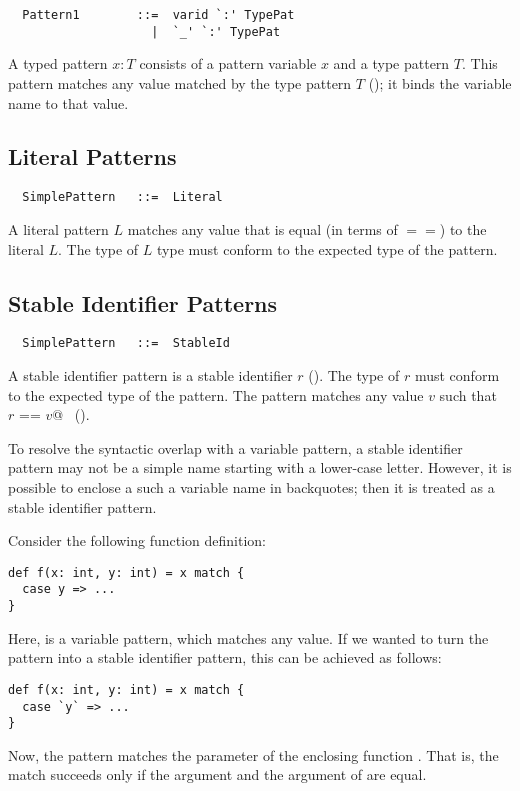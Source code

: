 \syntax
\begin{lstlisting}
  Pattern1        ::=  varid `:' TypePat
                    |  `_' `:' TypePat
\end{lstlisting}

A typed pattern $x: T$ consists of a pattern variable $x$ and a
type pattern $T$.  This pattern matches any value matched by the type
pattern $T$ (); it binds the variable name to
that value.

\subsection{Literal Patterns}

\syntax\begin{lstlisting}
  SimplePattern   ::=  Literal
\end{lstlisting}

A literal pattern $L$ matches any value that is equal (in terms of
$==$) to the literal $L$. The type of $L$ type must conform to the
expected type of the pattern.

\subsection{Stable Identifier Patterns} 

\syntax
\begin{lstlisting}
  SimplePattern   ::=  StableId
\end{lstlisting}

A stable identifier pattern is a stable identifier $r$
(). The type of $r$ must conform to the expected
type of the pattern. The pattern matches any value $v$ such that
~\lstinline@$r$ == $v$@~ ().

To resolve the syntactic overlap with a variable pattern, a
stable identifier pattern may not be a simple name starting with a lower-case
letter. However, it is possible to enclose a such a variable name in
backquotes; then it is treated as a stable identifier pattern.

\example Consider the following function definition:
\begin{lstlisting}
def f(x: int, y: int) = x match {
  case y => ...
}
\end{lstlisting}
Here, \lstinline@y@ is a variable pattern, which matches any value.
If we wanted to turn the pattern into a stable identifier pattern, this
can be achieved as follows:
\begin{lstlisting}
def f(x: int, y: int) = x match {
  case `y` => ...
}
\end{lstlisting}
Now, the pattern matches the  parameter of the enclosing function .
That is, the match succeeds only if the  argument and the 
argument of  are equal.

